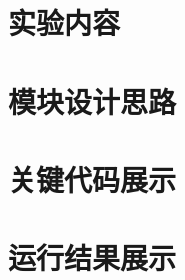 \documentclass{sysucseexp}
\begin{document}

\makecover
\tableofcontents
\cleardoublepage
\pagestyle{main} %

\section{实验内容}

\section{模块设计思路}

\section{关键代码展示}

\section{运行结果展示}
\end{document}
